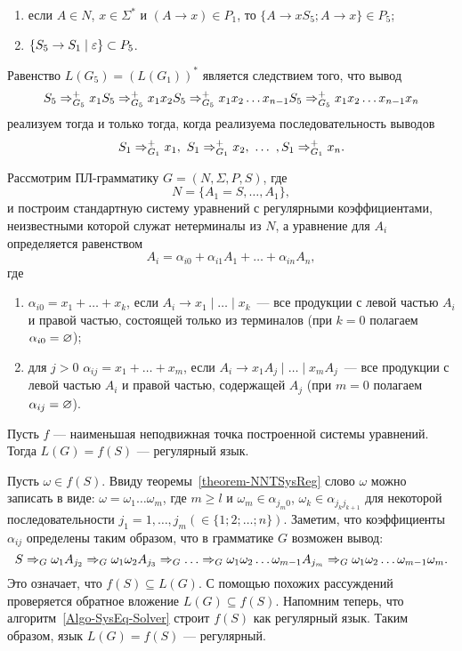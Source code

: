 \begin{myproof}
\begin{enumerate}
\begin{enumerate}[label=(\emph{\roman*})]
	\item если $A\in N$, $x\in\Sigma^*$ и $(A\to x)\in P_1$, то $\{A\to xS_5;A\to x\}\in P_5$;

	\item $\{S_5\to S_1\mid\varepsilon\}\subset P_5$.
\end{enumerate}
Равенство $L(G_5)=(L(G_1))^*$ является следствием того, что вывод
\[
S_5 \Rightarrow_{G_5}^+ x_1S_5 \Rightarrow_{G_5}^+ x_1x_2S_5 \Rightarrow_{G_5}^+ x_1x_2\ldots x_{n-1}S_5 \Rightarrow_{G_5}^+ x_1x_2\ldots x_{n-1}x_n
\]
реализуем тогда и только тогда, когда реализуема последовательность выводов
\[
S_1 \Rightarrow_{G_1}^+ x_1,~ S_1 \Rightarrow_{G_1}^+x_2,~\ldots ~, S_1 \Rightarrow_{G_1}^+ x_n.
\]
\end{enumerate}
\end{myproof}

\begin{mylemma}
\label{lemma-PL-reg-lang}
Рассмотрим ПЛ-грамматику $G=(N,\Sigma,P,S)$, где
\[
    N=\{A_1=S,\ldots ,A_1\},
\]
и построим стандартную систему уравнений с регулярными коэффициентами, неизвестными которой служат нетерминалы из $N$, а уравнение для $A_i$ определяется равенством
\[
A_i=\alpha_{i0}+\alpha_{i1}A_1+ \ldots +\alpha_{in}A_n,
\]
где
\begin{enumerate}
    \item $\alpha_{i0} = x_1 + \ldots + x_k$, если $A_i \to x_1 \mid \ldots
    \mid x_k$~--- все продукции с левой частью $A_i$ и правой частью,
    состоящей только из терминалов (при $k=0$ полагаем
    $\alpha_{i0}=\varnothing$);

    \item для $j>0$ $\alpha_{ij} = x_1 + \ldots + x_m$, если
    $A_i \to x_1A_j \mid \ldots  \mid x_mA_j$~--- все продукции с
    левой частью $A_i$ и правой частью, содержащей $A_j$
    (при $m=0$ полагаем $\alpha_{ij}=\varnothing$).
\end{enumerate}

Пусть $f$ --- наименьшая неподвижная точка построенной системы уравнений. Тогда $L(G)=f(S)$ --- регулярный язык.
\end{mylemma}

\begin{myproof}
Пусть $\omega\in f(S)$. Ввиду теоремы~\ref{theorem-NNTSysReg} слово $\omega$ можно записать в виде: $\omega=\omega_1\ldots \omega_m$, где $m\ge l$ и $\omega_m\in\alpha_{j_m0}$, $\omega_k\in\alpha_{j_kj_{k+1}}$ для некоторой последовательности $j_1=1, \ldots , j_m (\in\{1;2;\ldots ;n\})$. Заметим, что коэффициенты $\alpha_{ij}$ определены таким образом, что в грамматике $G$ возможен вывод:
\[
S \Rightarrow_G \omega_1A_{j_2} \Rightarrow_G \omega_1\omega_2A_{j_3} \Rightarrow_G \ldots \Rightarrow_G \omega_1\omega_2\ldots \omega_{m-1}A_{j_m} \Rightarrow_G \omega_1\omega_2\ldots \omega_{m-1}\omega_m.
\]
Это означает, что $f(S)\subseteq L(G)$. С помощью похожих рассуждений проверяется обратное вложение $L(G)\subseteq f(S)$. Напомним теперь, что алгоритм~\ref{Algo-SysEq-Solver} строит $f(S)$ как регулярный язык. Таким образом, язык $L(G)=f(S)$ --- регулярный.
\end{myproof}

